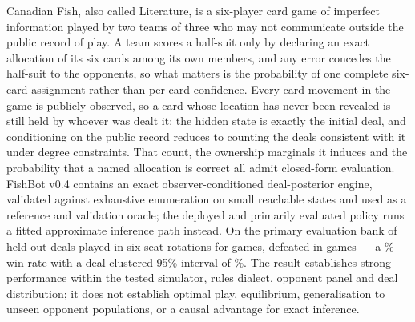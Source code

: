 Canadian Fish, also called Literature, is a six-player card game of imperfect
information played by two teams of three who may not communicate outside the
public record of play. A team scores a half-suit only by declaring an exact
allocation of its six cards among its own members, and any error concedes the
half-suit to the opponents, so what matters is the probability of one complete
six-card assignment rather than per-card confidence. Every card
movement in the game is publicly observed, so a card whose location has never
been revealed is still held by whoever was dealt it: the hidden state is exactly
the initial deal, and conditioning on the public record reduces to counting the
deals consistent with it under degree constraints. That count, the ownership
marginals it induces and the probability that a named allocation is correct all
admit closed-form evaluation. FishBot v0.4 contains an exact observer-conditioned deal-posterior
engine, validated against exhaustive enumeration on small reachable states and
used as a reference and validation oracle; the deployed and primarily evaluated \vfast{} policy runs a
fitted approximate inference path instead. On the primary evaluation bank of
\numHtHDeals{} held-out deals played in six seat rotations for \numHtHGames{}
games, \vfast{} defeated \vthree{} in \numVsVthreeWins{} games --- a
\numVsVthree\% win rate with a deal-clustered 95\% interval of
\numVsVthreeCI\%. The result establishes strong performance within the tested
simulator, rules dialect, opponent panel and deal distribution; it does not
establish optimal play, equilibrium, generalisation to unseen opponent
populations, or a causal advantage for exact inference.
